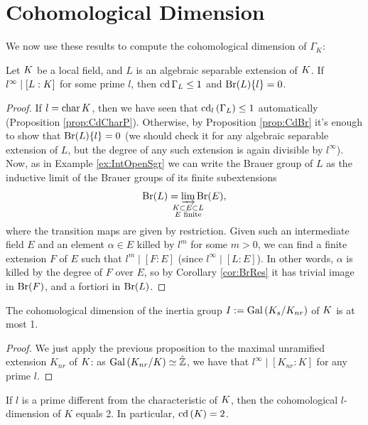 \documentclass[a4paper, oneside]{memoir}
\begin{document}
\section{Cohomological Dimension}

We now use these results to compute the cohomological dimension of $\Gamma_K$:

\begin{proposition}
    Let $K$ be a local field, and $L$ is an algebraic separable extension of $K$. If $l^\infty \mid [L:K]$ for some prime $l$, then $\operatorname{cd}{\Gamma_L}\leq 1$ and $\mathrm{Br}(L)\{l\}=0$.
\end{proposition}

\begin{proof}
    If $l = \operatorname{char}{K}$, then we have seen that $\operatorname{cd}_l{(\Gamma_L)}\leq 1$ automatically (Proposition \ref{prop:CdCharP}).
    Otherwise, by Proposition \ref{prop:CdBr} it's enough to show that $\mathrm{Br}(L)\{l\}=0$ (we should check it for any algebraic separable extension of $L$, but the degree of any such
    extension is again divisible by $l^\infty$).
    Now, as in Example \ref{ex:IntOpenSgr} we can write the Brauer group of $L$ as the inductive limit of the Brauer groups of its finite subextensions
    \[
        \Br{L}=\varinjlim_{\mathclap{\substack{\K\subset E\subset L \\ E\text{ finite}}}}{\Br{E}},
    \]
    where the transition maps are given by restriction.
    Given such an intermediate field $E$ and an element $\alpha\in E$ killed by $l^m$ for some $m>0$, we can find a finite extension $F$ of $E$ such that $l^m\mid [F:E]$ (since
    $l^\infty\mid [L:E]$). In other words, $\alpha$ is killed by the degree of $F$ over $E$, so by Corollary \ref{cor:BrRes} it has trivial image in $\mathrm{Br}(F)$, and a fortiori in $\mathrm{Br}(L)$.

\end{proof}

\begin{corollary}
    The cohomological dimension of the inertia group $I:=\operatorname{Gal}{(K_{s}/K_{nr})}$ of $K$ is at most 1.
\end{corollary}

\begin{proof}
    We just apply the previous proposition to the maximal unramified extension $K_{nr}$ of $K$: as $\operatorname{Gal}{(K_{nr}/K)}\simeq\hat{\mathbb{Z}}$, we have that
    $l^\infty\mid [K_{nr}:K]$ for any prime $l$.
\end{proof}

\begin{theorem}
    If $l$ is a prime different from the characteristic of $K$, then the cohomological $l$-dimension of $K$ equals 2. In particular, $\operatorname{cd}{(K)}=2$.
\end{theorem}
\end{document}

